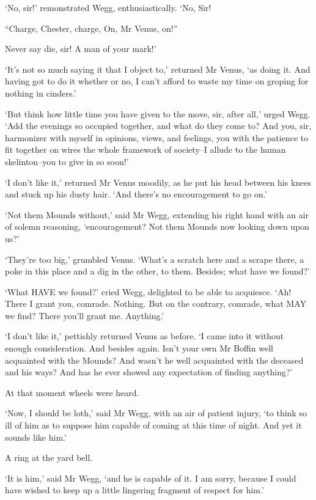 ‘No, sir!’ remonstrated Wegg, enthusiastically. ‘No, Sir!

     “Charge, Chester, charge,
     On, Mr Venus, on!”

Never say die, sir! A man of your mark!’

‘It’s not so much saying it that I object to,’ returned Mr Venus, ‘as
doing it. And having got to do it whether or no, I can’t afford to waste
my time on groping for nothing in cinders.’

‘But think how little time you have given to the move, sir, after all,’
urged Wegg. ‘Add the evenings so occupied together, and what do they
come to? And you, sir, harmonizer with myself in opinions, views, and
feelings, you with the patience to fit together on wires the whole
framework of society--I allude to the human skelinton--you to give in so
soon!’

‘I don’t like it,’ returned Mr Venus moodily, as he put his head between
his knees and stuck up his dusty hair. ‘And there’s no encouragement to
go on.’

‘Not them Mounds without,’ said Mr Wegg, extending his right hand with
an air of solemn reasoning, ‘encouragement? Not them Mounds now looking
down upon us?’

‘They’re too big,’ grumbled Venus. ‘What’s a scratch here and a scrape
there, a poke in this place and a dig in the other, to them. Besides;
what have we found?’

‘What HAVE we found?’ cried Wegg, delighted to be able to acquiesce.
‘Ah! There I grant you, comrade. Nothing. But on the contrary, comrade,
what MAY we find? There you’ll grant me. Anything.’

‘I don’t like it,’ pettishly returned Venus as before. ‘I came into
it without enough consideration. And besides again. Isn’t your own Mr
Boffin well acquainted with the Mounds? And wasn’t he well acquainted
with the deceased and his ways? And has he ever showed any expectation
of finding anything?’

At that moment wheels were heard.

‘Now, I should be loth,’ said Mr Wegg, with an air of patient injury,
‘to think so ill of him as to suppose him capable of coming at this time
of night. And yet it sounds like him.’

A ring at the yard bell.

‘It is him,’ said Mr Wegg, ‘and he is capable of it. I am sorry, because
I could have wished to keep up a little lingering fragment of respect
for him.’

